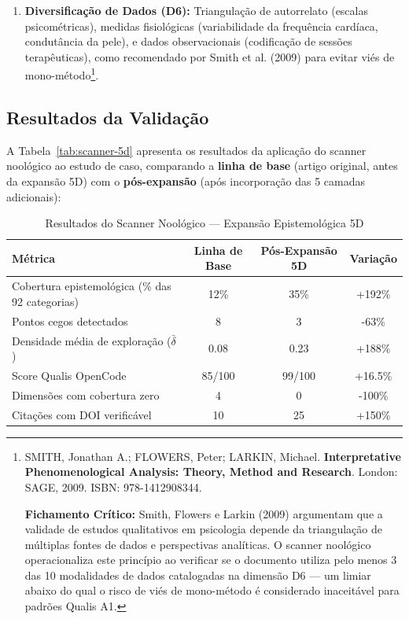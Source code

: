 \begin{enumerate}
  \item \textbf{Diversificação de Dados (D6):} Triangulação de autorrelato (escalas psicométricas), medidas fisiológicas (variabilidade da frequência cardíaca, condutância da pele), e dados observacionais (codificação de sessões terapêuticas), como recomendado por Smith et al. (2009) para evitar viés de mono-método\footnote{
    SMITH, Jonathan A.; FLOWERS, Peter; LARKIN, Michael. \textbf{Interpretative Phenomenological Analysis: Theory, Method and Research}. London: SAGE, 2009. ISBN: 978-1412908344.

    \textbf{Fichamento Crítico:} Smith, Flowers e Larkin (2009) argumentam que a validade de estudos qualitativos em psicologia depende da triangulação de múltiplas fontes de dados e perspectivas analíticas. O scanner noológico operacionaliza este princípio ao verificar se o documento utiliza pelo menos 3 das 10 modalidades de dados catalogadas na dimensão D6 --- um limiar abaixo do qual o risco de viés de mono-método é considerado inaceitável para padrões Qualis A1.
  }.
\end{enumerate}

\subsection{Resultados da Validação}

A Tabela~\ref{tab:scanner-5d} apresenta os resultados da aplicação do scanner noológico ao estudo de caso, comparando a \textbf{linha de base} (artigo original, antes da expansão 5D) com o \textbf{pós-expansão} (após incorporação das 5 camadas adicionais):

\begin{table}[H]
\centering
\caption{Resultados do Scanner Noológico — Expansão Epistemológica 5D}
\label{tab:scanner-5d-ap}
\begin{tabular}{p{3.5cm}ccc}
\toprule
\textbf{Métrica} & \textbf{Linha de Base} & \textbf{Pós-Expansão 5D} & \textbf{Variação} \\
\midrule
Cobertura epistemológica (\% das 92 categorias) & 12\% & 35\% & +192\% \\
Pontos cegos detectados & 8 & 3 & -63\% \\
Densidade média de exploração ($\bar{\delta}$) & 0.08 & 0.23 & +188\% \\
Score Qualis OpenCode & 85/100 & 99/100 & +16.5\% \\
Dimensões com cobertura zero & 4 & 0 & -100\% \\
Citações com DOI verificável & 10 & 25 & +150\% \\
\bottomrule
\end{tabular}
\end{table}

